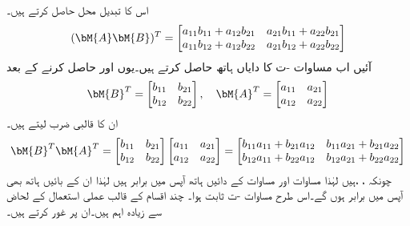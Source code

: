  اس کا تبدیل محل حاصل کرتے ہیں۔
\begin{align}\label{مساوات_الجبرا_تبدیل_محل_بائیں_ہاتھ}
(\bM{A}\bM{B})^T=\begin{bmatrix}a_{11}b_{11}+a_{12}b_{21} &a_{21}b_{11}+a_{22}b_{21} \\a_{11}b_{12}+a_{12}b_{22} & a_{21}b_{12}+a_{22}b_{22} \end{bmatrix}
\end{align}
آئیں اب مساوات -ت کا دایاں ہاتھ حاصل کرتے ہیں۔یوں  اور  حاصل کرنے کے بعد
\begin{align*}
\bM{B}^T=\begin{bmatrix} b_{11}& b_{21}\\ b_{12}& b_{22} \end{bmatrix}, \quad \bM{A}^T=\begin{bmatrix}a_{11}& a_{21}\\ a_{12}&a_{22}  \end{bmatrix}
\end{align*}
ان کا قالبی ضرب لیتے ہیں۔
\begin{align}\label{مساوات_الجبرا_تبدیل_محل_دائیں_ہاتھ}
\bM{B}^T\bM{A}^T=\begin{bmatrix} b_{11}& b_{21}\\ b_{12}& b_{22} \end{bmatrix}\begin{bmatrix}a_{11}& a_{21}\\ a_{12}&a_{22}  \end{bmatrix}=\begin{bmatrix}b_{11}a_{11}+b_{21}a_{12} &b_{11}a_{21}+b_{21}a_{22} \\b_{12}a_{11}+b_{22}a_{12} &b_{12} a_{21}+b_{22}a_{22} \end{bmatrix}
\end{align}
چونکہ ، ، ہیں لہٰذا مساوات  اور مساوات  کے دائیں ہاتھ آپس میں برابر ہیں لہٰذا ان کے بائیں ہاتھ بھی آپس میں برابر ہوں گے۔اس طرح  مساوات -ت ثابت ہوا۔
چند اقسام  کے قالب عملی استعمال کے لحاض سے زیادہ اہم ہیں۔ان پر غور کرتے ہیں۔

